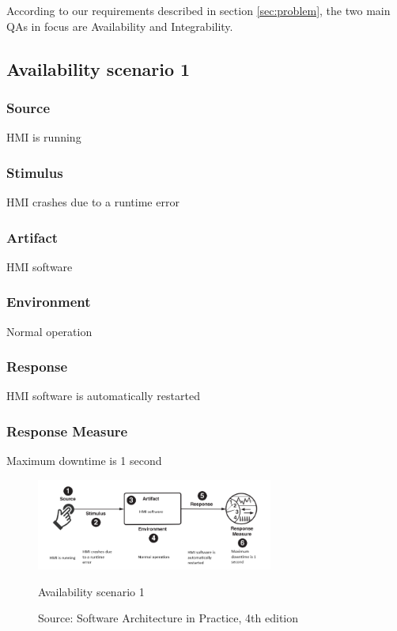 According to our requirements described in section \ref{sec:problem}, the two main QAs in focus are Availability and Integrability.

\subsection{Availability scenario 1}

\subsubsection{Source}
HMI is running

\subsubsection{Stimulus}
HMI crashes due to a runtime error

\subsubsection{Artifact}
HMI software

\subsubsection{Environment}
Normal operation

\subsubsection{Response}
HMI software is automatically restarted

\subsubsection{Response Measure}
Maximum downtime is 1 second

\begin{figure}[ht]
\centering
  \includegraphics[height=3cm]{images/qa_scenario_hmi_downtime.png}
  \caption{Availability scenario 1}
  \caption*{Source: Software Architecture in Practice, 4th edition \cite{bass2021software}}
  \label{fig:qa_availability_scenario_1}
\end{figure}

